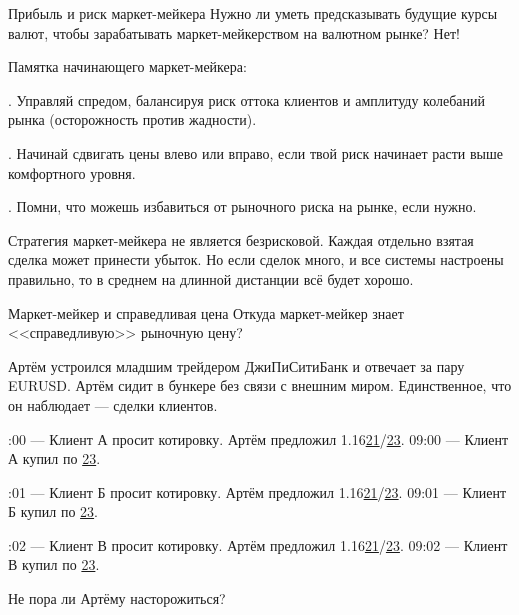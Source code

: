 \documentclass{beamer}
\newcommand{\eurusdBigFigures}{1.16}
\begin{document}
\begin{frame}{Прибыль и риск маркет-мейкера}
\justify
Нужно ли уметь предсказывать будущие курсы валют, чтобы зарабатывать маркет-мейкерством на валютном рынке? Нет!

\justify
Памятка начинающего маркет-мейкера:

. Управляй спредом, балансируя риск оттока клиентов и амплитуду колебаний рынка (осторожность против жадности).

. Начинай сдвигать цены влево или вправо, если твой риск начинает расти выше комфортного уровня.

. Помни, что можешь избавиться от рыночного риска на рынке, если нужно.

\justify
Стратегия маркет-мейкера не является безрисковой. Каждая отдельно взятая сделка
может принести убыток. Но если сделок много, и все системы настроены правильно,
то в среднем на длинной дистанции всё будет хорошо.
\end{frame}



\begin{frame}{Маркет-мейкер и справедливая цена}
\justify
Откуда маркет-мейкер знает <<справедливую>> рыночную цену?

\justify
Артём устроился младшим трейдером ДжиПиСитиБанк и отвечает за пару EURUSD. Артём сидит в бункере без связи с внешним миром. Единственное, что он наблюдает --- сделки клиентов.

:00 --- Клиент А просит котировку. Артём предложил \eurusdBigFigures\underline{21}/\underline{23}. 
09:00 --- Клиент А купил по \underline{23}.

:01 --- Клиент Б просит котировку. Артём предложил \eurusdBigFigures\underline{21}/\underline{23}.
09:01 --- Клиент Б купил по \underline{23}.

:02 --- Клиент В просит котировку. Артём предложил \eurusdBigFigures\underline{21}/\underline{23}. 
09:02 --- Клиент В купил по \underline{23}.

\justify
Не пора ли Артёму насторожиться?
\end{frame}
\end{document}
